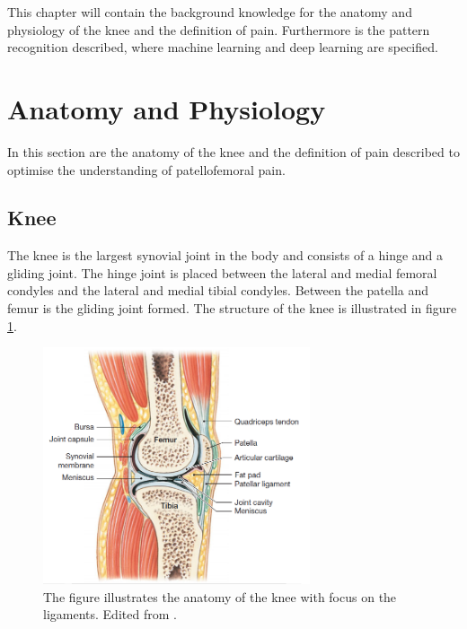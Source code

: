 This chapter will contain the background knowledge for the anatomy and physiology of the knee and the definition of pain. Furthermore is the pattern recognition described, where machine learning and deep learning are specified. 

\section{Anatomy and Physiology}
In this section are the anatomy of the knee and the definition of pain described to optimise the understanding of patellofemoral pain. 

\subsection{Knee}
The knee is the largest synovial joint in the body and consists of a hinge and a gliding joint. The hinge joint is placed between the lateral and medial femoral condyles and the lateral and medial tibial condyles. Between the patella and femur is the gliding joint formed. The structure of the knee is illustrated in figure \ref{fig:bonestruc}.\citep{Martini2012}

\begin{figure} [H]
\centering
\includegraphics[width=0.7\textwidth]{figures/bonestruc}
\caption{The figure illustrates the anatomy of the knee with focus on the ligaments. Edited from \citep{Martini2012}.}
\label{fig:bonestruc}
\end{figure}

